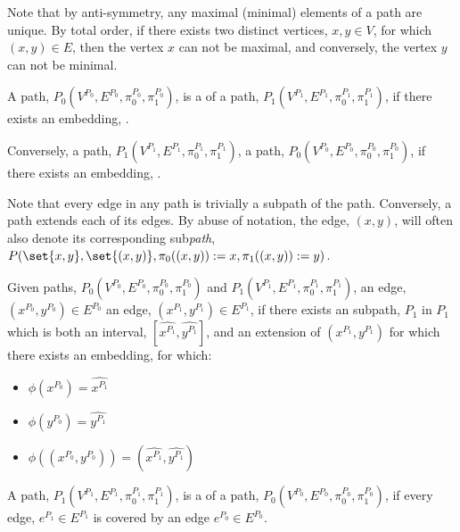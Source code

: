 Note that by anti-symmetry, any maximal (minimal) elements of a path are unique. By total
order, if there exists two distinct vertices, $x,y \in V$, for which $(x,y) \in E$, then
the vertex $x$ can not be maximal, and conversely, the vertex $y$ can not be minimal.

\begin{definition}
A path, $P_0(V^{P_0}, E^{P_0}, \pi^{P_0}_0, \pi^{P_0}_1)$, is a  of a
path, $P_1(V^{P_1}, E^{P_1}, \pi^{P_1}_0, \pi^{P_1}_1)$, if there exists an embedding,
.

Conversely, a path, $P_1(V^{P_1}, E^{P_1}, \pi^{P_1}_0, \pi^{P_1}_1)$, 
a path, $P_0(V^{P_0}, E^{P_0}, \pi^{P_0}_0, \pi^{P_0}_1)$, if there exists an embedding,
.
\end{definition}

Note that every edge in any path is trivially a subpath of the path. Conversely, a path
extends each of its edges. By abuse of notation, the edge, $(x,y)$, will often also denote
its corresponding sub\emph{path}, $P(\set{x,y}, \set{(x,y)}, \pi_0((x,y)):=x,
\pi_1((x,y)):=y)$.

\begin{definition}
Given paths, $P_0(V^{P_0}, E^{P_0}, \pi^{P_0}_0, \pi^{P_0}_1)$ and $P_1(V^{P_1}, E^{P_1},
\pi^{P_1}_0, \pi^{P_1}_1)$, an edge, $(x^{P_0}, y^{P_0}) \in E^{P_0}$  an
edge, $(x^{P_1}, y^{P_1}) \in E^{P_1}$, if there exists an subpath, $\hat{P_1}$ in $P_1$
which is both an interval, $[\hat{x^{P_1}}, \hat{y^{P_1}}]$, and an extension of
$(x^{P_1}, y^{P_1})$ for which there exists an embedding,  for which:
\begin{itemize}
\item $\phi(x^{P_0}) = \hat{x^{P_1}}$
\item $\phi(y^{P_0}) = \hat{y^{P_1}}$
\item $\phi( (x^{P_0}, y^{P_0}) ) = (\hat{x^{P_1}}, \hat{y^{P_1}})$
\end{itemize}
\end{definition}

\begin{definition}
A path, $P_1(V^{P_1}, E^{P_1}, \pi^{P_1}_0, \pi^{P_1}_1)$, is a  of a
path, $P_0(V^{P_0}, E^{P_0}, \pi^{P_0}_0, \pi^{P_0}_1)$, if every edge, $e^{P_1} \in 
E^{P_1}$ is covered by an edge $e^{P_0} \in E^{P_0}$.
\end{definition}

